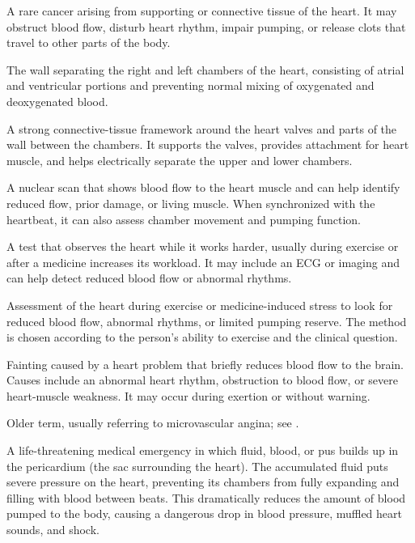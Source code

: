  A rare cancer arising from supporting or connective tissue of the heart. It may obstruct blood flow, disturb heart rhythm, impair pumping, or release clots that travel to other parts of the body.

 The wall separating the right and left chambers of the heart, consisting of atrial and ventricular portions and preventing normal mixing of oxygenated and deoxygenated blood.

 A strong connective-tissue framework around the heart valves and parts of the wall between the chambers. It supports the valves, provides attachment for heart muscle, and helps electrically separate the upper and lower chambers.

 A nuclear scan that shows blood flow to the heart muscle and can help identify reduced flow, prior damage, or living muscle. When synchronized with the heartbeat, it can also assess chamber movement and pumping function.

 A test that observes the heart while it works harder, usually during exercise or after a medicine increases its workload. It may include an ECG or imaging and can help detect reduced blood flow or abnormal rhythms.

 Assessment of the heart during exercise or medicine-induced stress to look for reduced blood flow, abnormal rhythms, or limited pumping reserve. The method is chosen according to the person's ability to exercise and the clinical question.

 Fainting caused by a heart problem that briefly reduces blood flow to the brain. Causes include an abnormal heart rhythm, obstruction to blood flow, or severe heart-muscle weakness. It may occur during exertion or without warning.

 Older term, usually referring to microvascular angina; see .

 A life-threatening medical emergency in which fluid, blood, or pus builds up in the pericardium (the sac surrounding the heart). The accumulated fluid puts severe pressure on the heart, preventing its chambers from fully expanding and filling with blood between beats. This dramatically reduces the amount of blood pumped to the body, causing a dangerous drop in blood pressure, muffled heart sounds, and shock.

